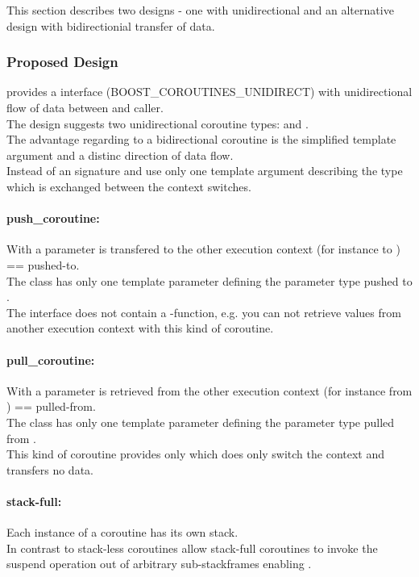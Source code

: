 This section describes two designs - one with unidirectional and an alternative
design with bidirectionial transfer of data.

\subsubsection*{Proposed Design}
\boostcoroutine provides a interface (BOOST\_COROUTINES\_UNIDIRECT) with
unidirectional flow of data between \corofunction and caller.\\
The design suggests two unidirectional coroutine types: \pushcoro and
\pullcoro.\\
The advantage regarding to a bidirectional coroutine is the simplified template
argument and a distinc direction of data flow.\\
Instead of an signature \pullcoro and \pushcoro use only one template argument
describing the type which is exchanged between the context switches.

\paragraph*{push\_coroutine:}
With \pushcoro a parameter is transfered to the other execution context (for
instance to \corofunction) == pushed-to.\\
The class has only one template parameter defining the parameter type pushed to
\corofunction.\\
\newline
The interface does not contain a -function, e.g. you can not retrieve
values from another execution context with this kind of coroutine.

\paragraph*{pull\_coroutine:}
With \pullcoro a parameter is retrieved from the other execution context (for
instance from \corofunction) == pulled-from.\\
The class has only one template parameter defining the parameter type pulled
from \corofunction.\\
\newline
This kind of coroutine provides only \pullcoroop which does only switch the
context and transfers no data.

\paragraph*{stack-full:}
Each instance of a coroutine has its own stack.\\
\newline
In contrast to stack-less coroutines allow stack-full coroutines to invoke the
suspend operation out of arbitrary sub-stackframes enabling \escreops.

